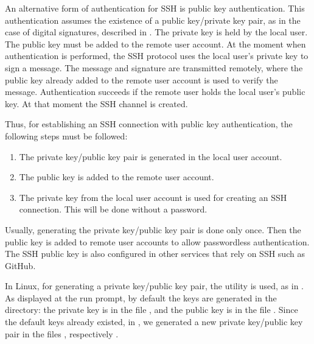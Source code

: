 An alternative form of authentication for SSH is public key authentication.
This authentication assumes the existence of a public key/private key pair, as in the case of digital signatures, described in .
The private key is held by the local user.
The public key must be added to the remote user account.
At the moment when authentication is performed, the SSH protocol uses the local user's private key to sign a message.
The message and signature are transmitted remotely, where the public key already added to the remote user account is used to verify the message.
Authentication succeeds if the remote user holds the local user's public key.
At that moment the SSH channel is created.

Thus, for establishing an SSH connection with public key authentication, the following steps must be followed:
\begin{enumerate}
  \item The private key/public key pair is generated in the local user account.
  \item The public key is added to the remote user account.
  \item The private key from the local user account is used for creating an SSH connection.
    This will be done without a password.
\end{enumerate}

Usually, generating the private key/public key pair is done only once.
Then the public key is added to remote user accounts to allow passwordless authentication.
The SSH public key is also configured in other services that rely on SSH such as GitHub.

In Linux, for generating a private key/public key pair, the  utility is used, as in .
As displayed at the  run prompt, by default the keys are generated in the  directory: the private key is in the file , and the public key is in the file .
Since the default keys already existed, in , we generated a new private key/public key pair in the files , respectively .



